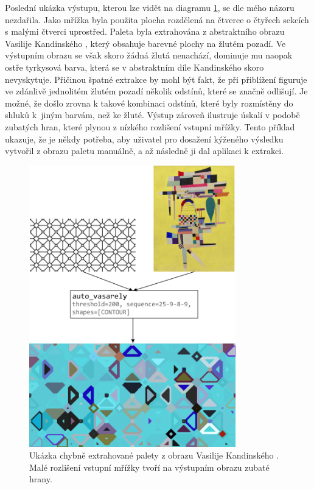 Poslední ukázka výstupu, kterou lze vidět na diagramu \ref{fig:square_tiles}, se dle mého názoru nezdařila. Jako mřížka byla použita plocha rozdělená na čtverce o čtyřech sekcích s malými čtverci uprostřed. Paleta byla extrahována z abstraktního obrazu Vasilije Kandinského \cite{yellow}, který obsahuje barevné plochy na žlutém pozadí. Ve výstupním obrazu se však skoro žádná žlutá nenachází, dominuje mu naopak ostře tyrkysová barva, která se v abstraktním díle Kandinského skoro nevyskytuje. Přičinou špatné extrakce by mohl být fakt, že při přiblížení figuruje ve zdánlivě jednolitém žlutém pozadí několik odstínů, které se značně odlišují. Je možné, že došlo zrovna k takové kombinaci odstínů, které byly rozmístěny do shluků k~jiným barvám, než ke žluté. Výstup zároveň ilustruje úskalí v podobě zubatých hran, které plynou z nízkého rozlišení vstupní mřížky. Tento příklad ukazuje, že je někdy potřeba, aby uživatel pro dosažení kýženého výsledku vytvořil z obrazu paletu manuálně, a až následně ji dal aplikaci k extrakci.
\begin{figure}[H]
    \centering
    \includegraphics[width=0.8\textwidth]{obrazky-figures/square_tiles.pdf}
    \caption{Ukázka chybně extrahované palety z obrazu Vasilije Kandinského \cite{yellow}. Malé rozlišení vstupní mřížky tvoří na výstupním obrazu zubaté hrany. }
    \label{fig:square_tiles}
\end{figure}

